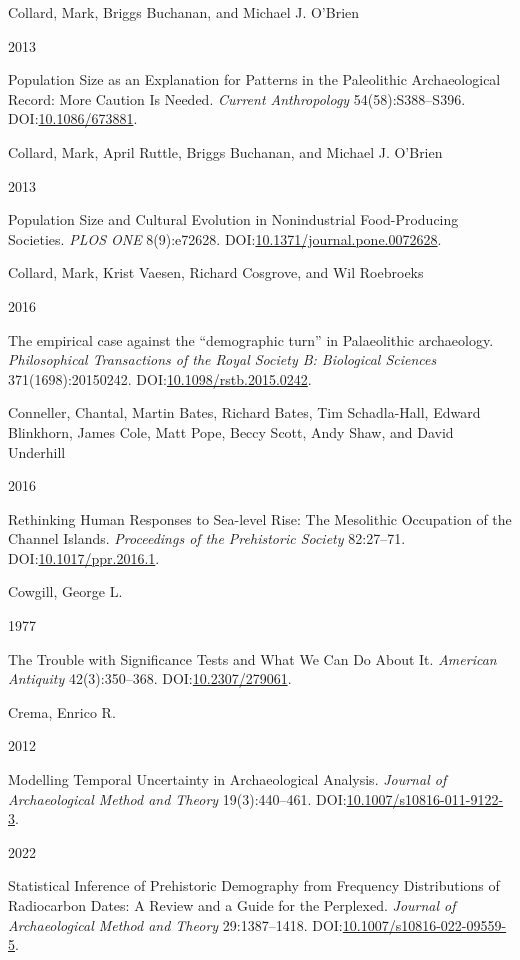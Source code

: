 \documentclass[
  12pt,
  a4paper,
  oneside]{book}
\newlength{\cslhangindent}
\newlength{\csllabelwidth}
\newlength{\cslentryspacingunit} %
\newenvironment{CSLReferences}[2] %
 {%
  \setlength{\parindent}{0pt}
  \ifodd #1
  \let\oldpar\par
  \def\par{\hangindent=\cslhangindent\oldpar}
  \fi
  \setlength{\parskip}{#2\cslentryspacingunit}
 }%
 {}
\newcommand{\CSLBlock}[1]{#1\hfill\break}
\newcommand{\CSLLeftMargin}[1]{\parbox[t]{\csllabelwidth}{#1}}
\newcommand{\CSLRightInline}[1]{\parbox[t]{\linewidth - \csllabelwidth}{#1}\break}
\begin{document}
\begin{CSLReferences}{0}{0}
\leavevmode{}%
\CSLBlock{Collard, Mark, Briggs Buchanan, and Michael J. O'Brien}
\CSLLeftMargin{ 2013}
\CSLRightInline{{Population Size as an Explanation for Patterns in the Paleolithic Archaeological Record: More Caution Is Needed}. \emph{Current Anthropology} 54(58):S388--S396. DOI:\href{https://doi.org/10.1086/673881}{10.1086/673881}.}

\leavevmode{}%
\CSLBlock{Collard, Mark, April Ruttle, Briggs Buchanan, and Michael J. O'Brien}
\CSLLeftMargin{ 2013}
\CSLRightInline{{Population Size and Cultural Evolution in Nonindustrial Food-Producing Societies}. \emph{PLOS ONE} 8(9):e72628. DOI:\href{https://doi.org/10.1371/journal.pone.0072628}{10.1371/journal.pone.0072628}.}

\leavevmode{}%
\CSLBlock{Collard, Mark, Krist Vaesen, Richard Cosgrove, and Wil Roebroeks}
\CSLLeftMargin{ 2016}
\CSLRightInline{{The empirical case against the {``demographic turn''} in Palaeolithic archaeology}. \emph{Philosophical Transactions of the Royal Society B: Biological Sciences} 371(1698):20150242. DOI:\href{https://doi.org/10.1098/rstb.2015.0242}{10.1098/rstb.2015.0242}.}

\leavevmode{}%
\CSLBlock{Conneller, Chantal, Martin Bates, Richard Bates, Tim Schadla-Hall, Edward Blinkhorn, James Cole, Matt Pope, Beccy Scott, Andy Shaw, and David Underhill}
\CSLLeftMargin{ 2016}
\CSLRightInline{{Rethinking Human Responses to Sea-level Rise: The Mesolithic Occupation of the Channel Islands}. \emph{Proceedings of the Prehistoric Society} 82:27--71. DOI:\href{https://doi.org/10.1017/ppr.2016.1}{10.1017/ppr.2016.1}.}

\leavevmode{}%
\CSLBlock{Cowgill, George L.}
\CSLLeftMargin{ 1977}
\CSLRightInline{{The Trouble with Significance Tests and What We Can Do About It}. \emph{American Antiquity} 42(3):350--368. DOI:\href{https://doi.org/10.2307/279061}{10.2307/279061}.}

\leavevmode{}%
\CSLBlock{Crema, Enrico R.}
\CSLLeftMargin{ 2012}
\CSLRightInline{Modelling Temporal Uncertainty in Archaeological Analysis. \emph{Journal of Archaeological Method and Theory} 19(3):440--461. DOI:\href{https://doi.org/10.1007/s10816-011-9122-3}{10.1007/s10816-011-9122-3}.}

\leavevmode{}%
\CSLLeftMargin{ 2022 }
\CSLRightInline{{Statistical Inference of Prehistoric Demography from Frequency Distributions of Radiocarbon Dates: A Review and a Guide for the Perplexed}. \emph{Journal of Archaeological Method and Theory} 29:1387--1418. DOI:\href{https://doi.org/10.1007/s10816-022-09559-5}{10.1007/s10816-022-09559-5}.}


\end{CSLReferences}
\end{document}
